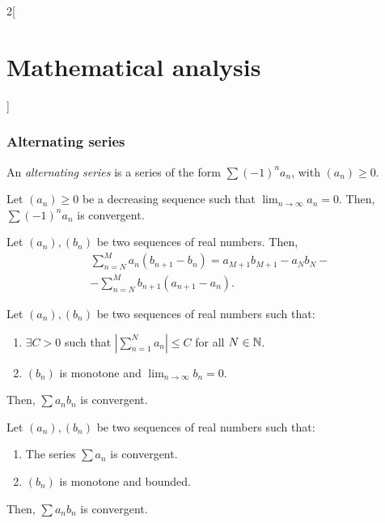 \documentclass[../../../main.tex]{subfiles}
\begin{document}
\begin{multicols}{2}[\section{Mathematical analysis}]
  \subsubsection{Alternating series}
  \begin{definition}
    An \textit{alternating series} is a series of the form $\sum (-1)^na_n$, with $(a_n)\geq 0$.
  \end{definition}
  \begin{theorem}
    Let $(a_n)\geq 0$ be a decreasing sequence such that $\displaystyle\lim_{n\to\infty}a_n=0$. Then, $\sum (-1)^na_n$ is convergent.
  \end{theorem}
  \begin{theorem}
    Let $(a_n),(b_n)$ be two sequences of real numbers. Then,
    \begin{multline*}
      \sum_{n=N}^M a_n(b_{n+1}-b_n)=a_{M+1}b_{M+1}-a_Nb_N-\\
      -\sum_{n=N}^Mb_{n+1}(a_{n+1}-a_n).
    \end{multline*}
  \end{theorem}
  \begin{theorem}
    Let $(a_n),(b_n)$ be two sequences of real numbers such that:
    \begin{enumerate}
      \item $\exists C>0$ such that $\displaystyle\left|\sum_{n=1}^Na_n\right|\leq C$ for all $N\in\mathbb{N} $.
      \item $(b_n)$ is monotone and $\displaystyle\lim_{n\to\infty}b_n=0$.
    \end{enumerate}
    Then, $\sum a_nb_n$ is convergent.
  \end{theorem}
  \begin{theorem}
    Let $(a_n),(b_n)$ be two sequences of real numbers such that:
    \begin{enumerate}
      \item The series $\sum a_n$ is convergent.
      \item $(b_n)$ is monotone and bounded.
    \end{enumerate}
    Then, $\sum a_nb_n$ is convergent.
  \end{theorem}

\end{multicols}
\end{document}

